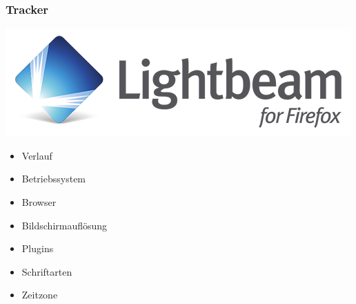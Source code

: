 
  
  \begin{frame}
    \frametitle{Tracker}
    \includegraphics[height=0.7\textheight]{img/lightbeam.png}
  \end{frame}
  
  \begin{frame}
    \begin{itemize}
      \item Verlauf
      \item Betriebssystem
      \item Browser
      \item Bildschirmauflösung
      \item Plugins
      \item Schriftarten
      \item Zeitzone
    \end{itemize}
  \end{frame}
  
